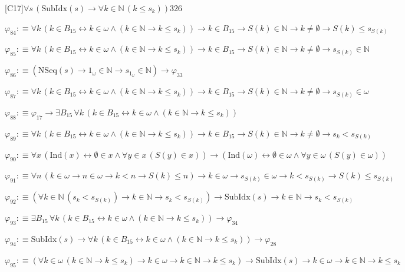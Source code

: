 \begin{fullproof}{[C17]}{$\forall s\,(\mathrm{SubIdx}(s) \to \forall k \in \mathbb{N}\,(k \leq s_{k}))$}{326}
\begin{abbrevlist}
\item $\varphi_{84} :\equiv \forall k\,(k \in B_{15} \leftrightarrow k \in \omega \land (k \in \mathbb{N} \to k \leq s_{k})) \to k \in B_{15} \to S(k) \in \mathbb{N} \to k \neq \emptyset \to S(k) \leq s_{S(k)}$
\item $\varphi_{85} :\equiv \forall k\,(k \in B_{15} \leftrightarrow k \in \omega \land (k \in \mathbb{N} \to k \leq s_{k})) \to k \in B_{15} \to S(k) \in \mathbb{N} \to k \neq \emptyset \to s_{S(k)} \in \mathbb{N}$
\item $\varphi_{86} :\equiv (\mathrm{NSeq}(s) \to 1_{\omega} \in \mathbb{N} \to s_{1_{\omega}} \in \mathbb{N}) \to \varphi_{33}$
\item $\varphi_{87} :\equiv \forall k\,(k \in B_{15} \leftrightarrow k \in \omega \land (k \in \mathbb{N} \to k \leq s_{k})) \to k \in B_{15} \to S(k) \in \mathbb{N} \to k \neq \emptyset \to s_{S(k)} \in \omega$
\item $\varphi_{88} :\equiv \varphi_{17} \to \exists B_{15}\,\forall k\,(k \in B_{15} \leftrightarrow k \in \omega \land (k \in \mathbb{N} \to k \leq s_{k}))$
\item $\varphi_{89} :\equiv \forall k\,(k \in B_{15} \leftrightarrow k \in \omega \land (k \in \mathbb{N} \to k \leq s_{k})) \to k \in B_{15} \to S(k) \in \mathbb{N} \to k \neq \emptyset \to s_{k} < s_{S(k)}$
\item $\varphi_{90} :\equiv \forall x\,(\mathrm{Ind}(x) \leftrightarrow \emptyset \in x \land \forall y \in x\,(S(y) \in x)) \to (\mathrm{Ind}(\omega) \leftrightarrow \emptyset \in \omega \land \forall y \in \omega\,(S(y) \in \omega))$
\item $\varphi_{91} :\equiv \forall n\,(k \in \omega \to n \in \omega \to k < n \to S(k) \leq n) \to k \in \omega \to s_{S(k)} \in \omega \to k < s_{S(k)} \to S(k) \leq s_{S(k)}$
\item $\varphi_{92} :\equiv (\forall k \in \mathbb{N}\,(s_{k} < s_{S(k)}) \to k \in \mathbb{N} \to s_{k} < s_{S(k)}) \to \mathrm{SubIdx}(s) \to k \in \mathbb{N} \to s_{k} < s_{S(k)}$
\item $\varphi_{93} :\equiv \exists B_{15}\,\forall k\,(k \in B_{15} \leftrightarrow k \in \omega \land (k \in \mathbb{N} \to k \leq s_{k})) \to \varphi_{34}$
\item $\varphi_{94} :\equiv \mathrm{SubIdx}(s) \to \forall k\,(k \in B_{15} \leftrightarrow k \in \omega \land (k \in \mathbb{N} \to k \leq s_{k})) \to \varphi_{28}$
\item $\varphi_{95} :\equiv (\forall k \in \omega\,(k \in \mathbb{N} \to k \leq s_{k}) \to k \in \omega \to k \in \mathbb{N} \to k \leq s_{k}) \to \mathrm{SubIdx}(s) \to k \in \omega \to k \in \mathbb{N} \to k \leq s_{k}$

\end{abbrevlist}
\end{fullproof}
